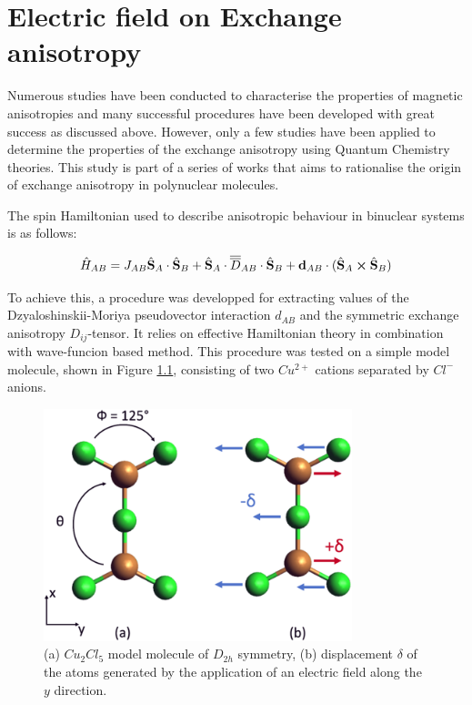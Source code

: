 \documentclass[10pt]{report}
\numberwithin{equation}{section}
\begin{document}
\chapter{Electric field on Exchange anisotropy}\label{chap:Cu2Cl5}

Numerous studies have been conducted to characterise the properties of magnetic anisotropies and many successful procedures have been developed with great success as discussed above. 
However, only a few studies have been applied to determine the properties of the exchange anisotropy using Quantum Chemistry theories.
This study is part of a series of works that aims to rationalise the origin of exchange anisotropy in polynuclear molecules.
\par The spin Hamiltonian used to describe anisotropic behaviour in binuclear systems is as follows:

\begin{equation}
    \hat{H}_{AB}=J_{AB}\hat{\vb S}_A \cdot \hat{\vb S}_B + \hat{\vb S}_A \cdot\overline{\overline{D}}_{AB} \cdot \hat{\vb S}_B + \vb{d}_{AB} \cdot (\hat{\vb S}_A \cross \hat{\vb S}_B)
\end{equation}

To achieve this, a procedure was developped for extracting values of the Dzyaloshinskii-Moriya pseudovector interaction $d_{AB}$ and the symmetric exchange anisotropy $D_{ij}$-tensor. 
It relies on effective Hamiltonian theory in combination with wave-funcion based method.
This procedure was tested on a simple model molecule, shown in Figure \ref{MolCu2Cl5}, consisting of two $Cu^{2+}$ cations separated by $Cl^-$ anions.
\begin{figure}[!ht]
    \centering
    \includegraphics[width=0.8\textwidth]{Images/Cu2Cl5.png}
    \caption{(a) $Cu_2Cl_5$ model molecule of $D_{2h}$ symmetry, (b) displacement $\delta$ of the atoms generated by the application of an electric field along the $y$ direction.}
    \label{MolCu2Cl5}
\end{figure}
\end{document}
